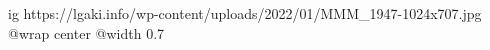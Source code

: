  
 
 
 
 

\ifcmt
  ig https://lgaki.info/wp-content/uploads/2022/01/MMM_1947-1024x707.jpg
  @wrap center
  @width 0.7
\fi
